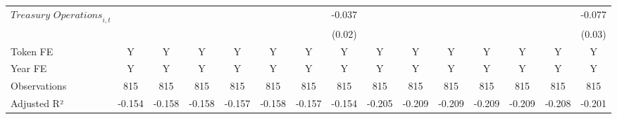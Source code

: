{\begin{tabular}{l*{14}{c}}
$\textit{Treasury Operations}_{i,t}$&                     &                     &                     &                     &                     &                     &      -0.037\sym{*}  &                     &                     &                     &                     &                     &                     &      -0.077\sym{**} \\
                    &                     &                     &                     &                     &                     &                     &      (0.02)         &                     &                     &                     &                     &                     &                     &      (0.03)         \\
\midrule
Token FE            &           Y         &           Y         &           Y         &           Y         &           Y         &           Y         &           Y         &           Y         &           Y         &           Y         &           Y         &           Y         &           Y         &           Y         \\
Year FE             &           Y         &           Y         &           Y         &           Y         &           Y         &           Y         &           Y         &           Y         &           Y         &           Y         &           Y         &           Y         &           Y         &           Y         \\
Observations        &         815         &         815         &         815         &         815         &         815         &         815         &         815         &         815         &         815         &         815         &         815         &         815         &         815         &         815         \\
Adjusted R²         &      -0.154         &      -0.158         &      -0.158         &      -0.157         &      -0.158         &      -0.157         &      -0.154         &      -0.205         &      -0.209         &      -0.209         &      -0.209         &      -0.209         &      -0.208         &      -0.201         \\
\bottomrule
\end{tabular}
}
